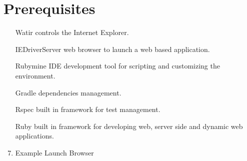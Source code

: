 \section{Prerequisites}

\begin{enumerate}

\item [Watir] \quad controls the Internet Explorer.

\item [IEDriverServer] \quad web browser to launch a web based application.

\item [Rubymine IDE] \quad development tool for scripting and customizing the environment.

\item [Gradle] \quad dependencies management.

\item [Rspec] \quad built in framework for test management.

\item [Ruby] \quad built in framework for developing web, server side and dynamic web applications.

\item {Example Launch Browser}

\end{enumerate}